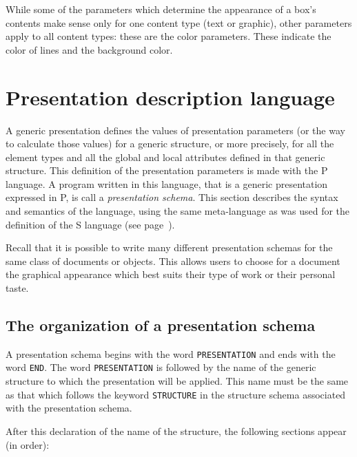 While some of the parameters which determine the appearance of a box's
contents make sense only for one content type (text or graphic), other
parameters apply to all content types: these are the color parameters.
These indicate the color of lines and the background color.

\section{Presentation description language}
\label{langp}

A generic presentation defines the values of presentation parameters
(or the way to calculate those values) for a generic structure, or
more precisely, for all the element types and all the global and local
attributes defined in that generic structure.  This definition of the
presentation parameters is made with the P language.  A program
written in this language, that is a generic presentation expressed in
P, is call a {\em presentation schema}.  This section describes the
syntax and semantics of the language, using the same meta-language as
was used for the definition of the S language (see
page~\pageref{metalang}).

Recall that it is possible to write many different presentation
schemas for the same class of documents or objects.  This allows users
to choose for a document the graphical appearance  which best suits
their type of work or their personal taste.

\subsection{The organization of a presentation schema}

A presentation schema begins with the word {\tt PRESENTATION} and ends
with the word {\tt END}.  The word {\tt PRESENTATION} is followed by
the name of the generic structure to which the presentation will be
applied.  This name must be the same as that which follows the
keyword {\tt STRUCTURE} in the structure schema associated with the
presentation schema.

After this declaration of the name of the structure, the following
sections appear (in order):

